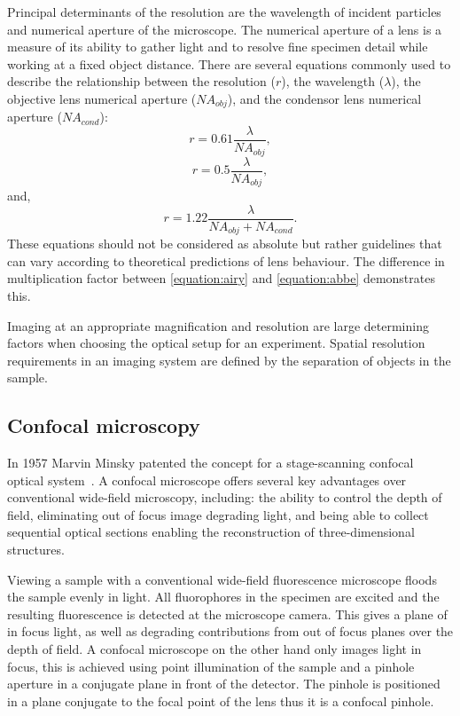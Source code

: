 Principal determinants of the resolution are the wavelength of incident particles and numerical aperture of the microscope. The numerical aperture of a lens is a measure of its ability to gather light and to resolve fine specimen detail while working at a fixed object distance. There are several equations commonly used to describe the relationship between the resolution ($r$), the wavelength ($\lambda$), the objective lens numerical aperture ($NA_{obj}$), and the condensor lens numerical aperture ($NA_{cond}$):
\begin{equation}
r=0.61\frac{\lambda}{NA_{obj}},
\label{equation:airy}
\end{equation}
\begin{equation}
r=0.5\frac{\lambda}{NA_{obj}},
\label{equation:abbe}
\end{equation}
and,
\begin{equation}
r=1.22\frac{\lambda}{NA_{obj} + NA_{cond}}.
\label{equation:resolution}
\end{equation}
These equations should not be considered as absolute but rather guidelines that can vary according to theoretical predictions of lens behaviour. The difference in multiplication factor between \autoref{equation:airy} and \autoref{equation:abbe} demonstrates this.

Imaging at an appropriate magnification and resolution are large determining factors when choosing the optical setup for an experiment. Spatial resolution requirements in an imaging system are defined by the separation of objects in the sample.

\subsection{Confocal microscopy}
\label{introduction:microscopy:confocal}
In 1957 Marvin Minsky patented the concept for a stage-scanning confocal optical system~\cite{Minsky1988}. A confocal microscope offers several key advantages over conventional wide-field microscopy, including: the ability to control the depth of field, eliminating out of focus image degrading light, and being able to collect sequential optical sections enabling the reconstruction of three-dimensional structures.

Viewing a sample with a conventional wide-field fluorescence microscope floods the sample evenly in light. All fluorophores in the specimen are excited and the resulting fluorescence is detected at the microscope camera. This gives a plane of in focus light, as well as degrading contributions from out of focus planes over the depth of field. A confocal microscope on the other hand only images light in focus, this is achieved using point illumination of the sample and a pinhole aperture in a conjugate plane in front of the detector. The pinhole is positioned in a plane conjugate to the focal point of the lens thus it is a confocal pinhole.

